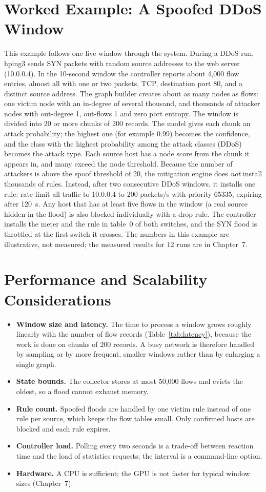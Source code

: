 \section{Worked Example: A Spoofed DDoS Window}
This example follows one live window through the system. During a DDoS run, hping3 sends SYN packets with random source addresses to the web server (10.0.0.4). In the 10-second window the controller reports about 4,000 flow entries, almost all with one or two packets, TCP, destination port 80, and a distinct source address. The graph builder creates about as many nodes as flows: one victim node with an in-degree of several thousand, and thousands of attacker nodes with out-degree 1, out-flows 1 and zero port entropy. The window is divided into 20 or more chunks of 200 records. The model gives each chunk an attack probability; the highest one (for example 0.99) becomes the confidence, and the class with the highest probability among the attack classes (DDoS) becomes the attack type. Each source host has a node score from the chunk it appears in, and many exceed the node threshold. Because the number of attackers is above the spoof threshold of 20, the mitigation engine does \emph{not} install thousands of rules. Instead, after two consecutive DDoS windows, it installs one rule: rate-limit all traffic to 10.0.0.4 to 200 packets/s with priority 65335, expiring after 120~s. Any host that has at least five flows in the window (a real source hidden in the flood) is also blocked individually with a drop rule. The controller installs the meter and the rule in table~0 of both switches, and the SYN flood is throttled at the first switch it crosses. The numbers in this example are illustrative, not measured; the measured results for 12 runs are in Chapter~7.

\section{Performance and Scalability Considerations}
\begin{itemize}
	\item \textbf{Window size and latency.} The time to process a window grows roughly linearly with the number of flow records (Table~\ref{tab:latency}), because the work is done on chunks of 200 records. A busy network is therefore handled by sampling or by more frequent, smaller windows rather than by enlarging a single graph.
	\item \textbf{State bounds.} The collector stores at most 50,000 flows and evicts the oldest, so a flood cannot exhaust memory.
	\item \textbf{Rule count.} Spoofed floods are handled by one victim rule instead of one rule per source, which keeps the flow tables small. Only confirmed hosts are blocked and each rule expires.
	\item \textbf{Controller load.} Polling every two seconds is a trade-off between reaction time and the load of statistics requests; the interval is a command-line option.
	\item \textbf{Hardware.} A CPU is sufficient; the GPU is not faster for typical window sizes (Chapter~7).
\end{itemize}


